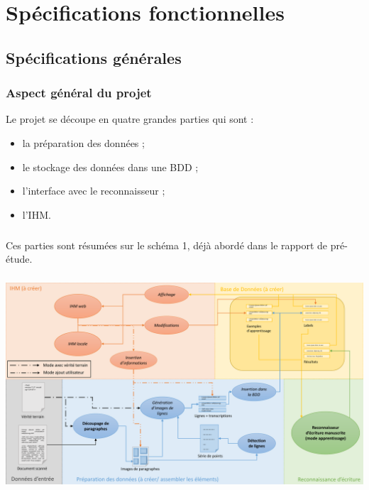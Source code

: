 \chapter{Spécifications fonctionnelles}

\section{Spécifications générales}

\subsection{Aspect général du projet}

Le projet se découpe en quatre grandes parties qui sont :
\begin{itemize}
	\item la préparation des données ;
	\item le stockage des données dans une BDD ;
	\item l'interface avec le reconnaisseur ;
	\item l'IHM.
\end{itemize}

\paragraph{}
Ces parties sont résumées sur le schéma 1, déjà abordé dans le rapport de
pré-étude.

\paragraph{}
\begin{mdframed}[frametitle={Figure 1 : Décomposition du projet (mode apprentissage)}, innerbottommargin=10]
\begin{center}
\includegraphics[width=\linewidth]{schema_mode1.1.pdf}
\end{center}
\end{mdframed}

